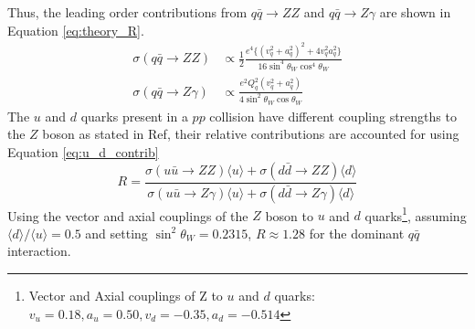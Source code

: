 \documentclass[11pt,a4paper,openright,twoside]{report}
\begin{document}
Thus, the leading order contributions from $q\bar{q}\rightarrow ZZ$ and $q\bar{q}\rightarrow Z\gamma$ are shown in Equation \ref{eq:theory_R}.
\begin{equation}
\begin{split}
	\sigma(q\bar{q}\rightarrow ZZ) &\propto \frac{1}{2}\frac{e^4\{(v_q^2 + a_q^2)^2 + 4v_q^2a_q^2\} }{16\sin^4\theta_W\cos^4\theta_W}\\[1.5ex]
	\sigma(q\bar{q}\rightarrow Z\gamma) &\propto \frac{e^2Q_q^2(v^2_q + a^2_q)}{4\sin^2\theta_W\cos\theta_W}
\end{split}
\label{eq:theory_R}
\end{equation}
The $u$ and $d$ quarks present in a $pp$ collision have different coupling strengths to the $Z$ boson as stated in Ref\cite{Z_coupling}, their relative contributions are accounted for using Equation \ref{eq:u_d_contrib}
\begin{equation}
R = \frac{\sigma(u\bar{u}\rightarrow ZZ)\langle u\rangle + \sigma(d\bar{d}\rightarrow ZZ)\langle d\rangle}{\sigma(u\bar{u}\rightarrow Z\gamma)\langle u\rangle + \sigma(d\bar{d}\rightarrow Z\gamma)\langle d\rangle}
\label{eq:u_d_contrib}
\end{equation}
Using the vector and axial couplings of the $Z$ boson to $u$ and $d$ quarks\footnote{Vector and Axial couplings of Z to $u$ and $d$ quarks: $v_u = 0.18, a_u = 0.50, v_d = -0.35, a_d = -0.514$}, assuming $\langle d \rangle/\langle u\rangle = 0.5$ and setting $\sin^2\theta_W = 0.2315$, $R\approx 1.28$ for the dominant $q\bar{q}$ interaction.
%
%
%
%
\end{document}
